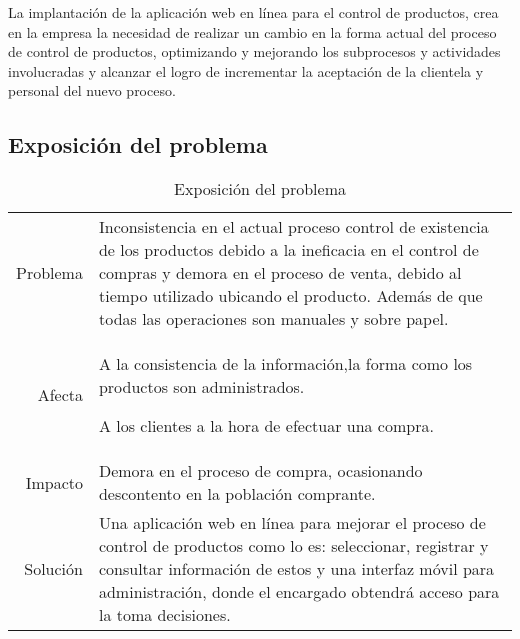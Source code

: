 \documentclass[a4paper,11pt, spanish]{report}
\begin{document}
La implantación de la aplicación web en línea para el control de productos, crea en la empresa la necesidad de realizar un cambio	en la forma   actual del proceso de control de productos, optimizando y mejorando los subprocesos y actividades involucradas y alcanzar el logro de incrementar la aceptación de la clientela y personal del nuevo proceso.
      
      \subsection{Exposición del problema}
      {\renewcommand{\arraystretch}{1.5}%
      \noindent\begin{table}[H]
      \noindent\begin{tabularx}{\textwidth}{r|X}
        Problema & Inconsistencia en el actual proceso control de existencia de los productos debido a la ineficacia en el control de compras y demora en el proceso de venta, debido al tiempo utilizado ubicando el producto. Además de que todas las operaciones son manuales y sobre papel.\\
        Afecta & A la consistencia de la información,la forma como los productos son
administrados.

A los clientes a la hora de efectuar una compra. \\
        Impacto & Demora en el proceso de compra, ocasionando descontento en la población
comprante. \\
        Solución & Una aplicación web en línea para mejorar el proceso de control de productos
como lo es: seleccionar, registrar y consultar información de estos y una interfaz móvil para administración, donde el encargado obtendrá acceso 
para la toma decisiones.\\
      \end{tabularx}
      \caption{Exposición del problema}
      \end{table}
      
}
\end{document}
